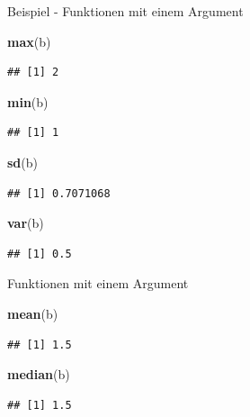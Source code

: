 \documentclass[ignorenonframetext,]{beamer}
\newenvironment{Shaded}{}{}
\newcommand{\KeywordTok}[1]{\textcolor[rgb]{0.00,0.44,0.13}{\textbf{{#1}}}}
\newcommand{\NormalTok}[1]{{#1}}
\begin{document}
\begin{frame}[fragile]{Beispiel - Funktionen mit einem Argument}

\begin{Shaded}
\begin{Highlighting}[]
\KeywordTok{max}\NormalTok{(b)}
\end{Highlighting}
\end{Shaded}

\begin{verbatim}
## [1] 2
\end{verbatim}

\begin{Shaded}
\begin{Highlighting}[]
\KeywordTok{min}\NormalTok{(b)}
\end{Highlighting}
\end{Shaded}

\begin{verbatim}
## [1] 1
\end{verbatim}

\begin{Shaded}
\begin{Highlighting}[]
\KeywordTok{sd}\NormalTok{(b)}
\end{Highlighting}
\end{Shaded}

\begin{verbatim}
## [1] 0.7071068
\end{verbatim}

\begin{Shaded}
\begin{Highlighting}[]
\KeywordTok{var}\NormalTok{(b)}
\end{Highlighting}
\end{Shaded}

\begin{verbatim}
## [1] 0.5
\end{verbatim}

\end{frame}

\begin{frame}[fragile]{Funktionen mit einem Argument}

\begin{Shaded}
\begin{Highlighting}[]
\KeywordTok{mean}\NormalTok{(b)}
\end{Highlighting}
\end{Shaded}

\begin{verbatim}
## [1] 1.5
\end{verbatim}

\begin{Shaded}
\begin{Highlighting}[]
\KeywordTok{median}\NormalTok{(b)}
\end{Highlighting}
\end{Shaded}

\begin{verbatim}
## [1] 1.5
\end{verbatim}

\end{frame}
\end{document}
